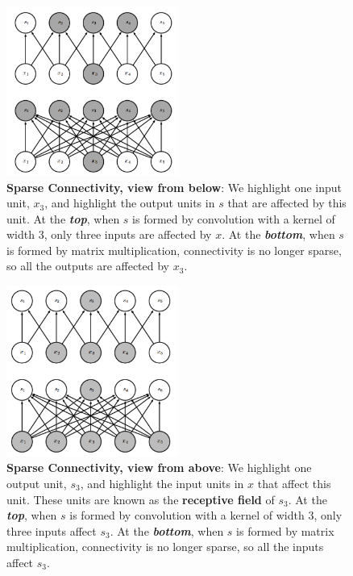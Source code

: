 \documentclass{report}
\begin{document}
\begin{figure}[H]
  \centering
  \includegraphics[width=0.5\textwidth]{Convolutional_Networks/sparse_connectivity_1.png}
  \caption{\textbf{Sparse Connectivity, view from below}: We highlight one input unit, $x_3$, and highlight the output units in $s$ that are affected by this unit. At the \textbf{\textit{top}}, when $s$ is formed by convolution with a kernel of width 3, only three inputs are affected by $x$. At the \textbf{\textit{bottom}}, when $s$ is formed by matrix multiplication, connectivity is no longer sparse, so all the outputs are affected by $x_3$.}
\end{figure}

\begin{figure}[H]
  \centering
  \includegraphics[width=0.5\textwidth]{Convolutional_Networks/sparse_connectivity_2.png}
  \caption{\textbf{Sparse Connectivity, view from above}: We highlight one output unit, $s_3$, and highlight the input units in $x$ that affect this unit. These units are known as the \textbf{receptive field} of $s_3$. At the \textbf{\textit{top}}, when $s$ is formed by convolution with a kernel of width 3, only three inputs affect $s_3$. At the \textbf{\textit{bottom}}, when $s$ is formed by matrix multiplication, connectivity is no longer sparse, so all the inputs affect $s_3$.}
\end{figure}
\end{document}
